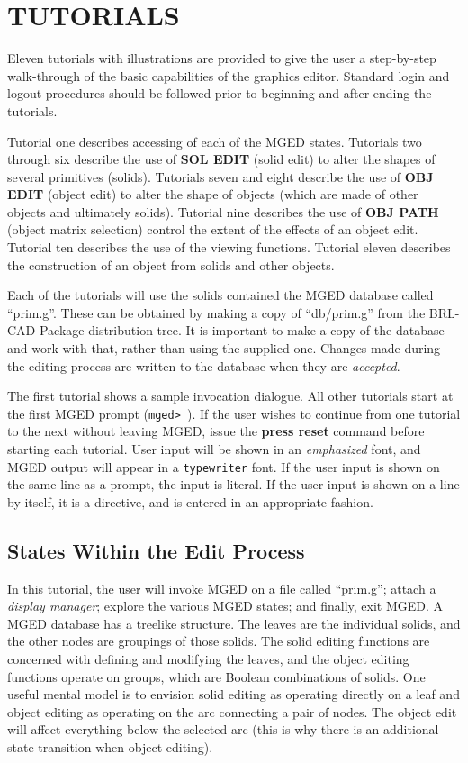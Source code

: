 \chapter{TUTORIALS}
Eleven tutorials with illustrations are provided to give the user a
step-by-step walk-through of the basic capabilities of the graphics
editor. Standard login and logout procedures should be followed prior to
beginning and after ending the tutorials.

Tutorial one describes accessing of each of the MGED states.
Tutorials two through six describe the use of
{\bf SOL EDIT}
(solid edit) to alter the shapes of several primitives (solids).
Tutorials seven and eight describe the use of
{\bf OBJ EDIT}
(object edit) to alter the shape of objects (which are made of other objects
and ultimately solids).
Tutorial nine describes the use of
{\bf OBJ PATH}
(object matrix selection) control the extent of the effects of an object edit.
Tutorial ten describes the use of the viewing functions.
Tutorial eleven describes the construction of an object from solids and
other objects.

Each of the tutorials will use the solids contained the MGED database called
``prim.g''.
These can be obtained by making a copy of ``db/prim.g''
from the BRL-CAD Package distribution tree.  It is important to make
a copy of the database and work with that, rather than using the
supplied one.  Changes made during the editing process are written
to the database when they are {\sl accepted}.

The first tutorial shows a sample invocation dialogue.  All other
tutorials start at the first MGED prompt ({\tt mged> }). If the user
wishes to continue from one tutorial to the next without leaving MGED, issue
the {\bf press reset} command before starting each tutorial.
User input will be shown in an
{\em emphasized} font, and MGED output will appear in a {\tt typewriter}
font.  If the user input is shown on the same line as a prompt, the
input is literal.  If the user input is shown on a line by itself,
it is a directive, and is entered in an appropriate fashion.

\section{States Within the Edit Process}

In this tutorial, the user will invoke MGED on a file called ``prim.g'';
attach a {\sl display manager\/}; explore the various MGED states;
and finally, exit MGED.  A MGED database has a treelike structure.  The
leaves are the individual solids, and the other nodes are groupings
of those solids.  The solid editing functions are concerned with defining
and modifying the leaves, and the object editing functions operate
on groups, which are Boolean combinations of solids.  One useful mental
model is to envision solid editing as operating directly on a leaf and
object editing as operating on the arc connecting a pair of nodes.  The
object edit will affect everything below the selected arc (this is why
there is an additional state transition when object editing).

